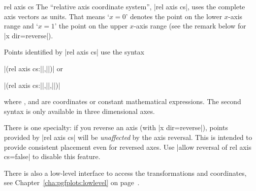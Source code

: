 \begin{coordinatesystem}{rel axis cs}
    The ``relative axis coordinate system'', |rel axis cs|, uses the complete
    axis vectors as units. That means `$x=0$' denotes the point on the lower
    $x$-axis range and `$x=1$' the point on the upper $x$-axis range (see the
    remark below for |x dir=reverse|).
\pgfplotsexpensiveexample
\begin{codeexample}[]
\end{codeexample}

\pgfplotsexpensiveexample
\begin{codeexample}[]
\end{codeexample}

    Points identified by |rel axis cs| use the syntax

        |(rel axis cs:||,||)| or

        |(rel axis cs:||,||,||)|

    \noindent where ,  and  are coordinates or constant
    mathematical expressions. The second syntax is only available in three
    dimensional axes.

    There is one specialty: if you reverse an axis (with |x dir=reverse|),
    points provided by |rel axis cs| will be \emph{unaffected} by the axis
    reversal. This is intended to provide consistent placement even for
    reversed axes. Use |allow reversal of rel axis cs=false| to disable this
    feature.

    There is also a low-level interface to access the transformations and
    coordinates, see Chapter~\ref{cha:pgfplots:lowlevel} on
    page~\pageref{cha:pgfplots:lowlevel}.
\end{coordinatesystem}

